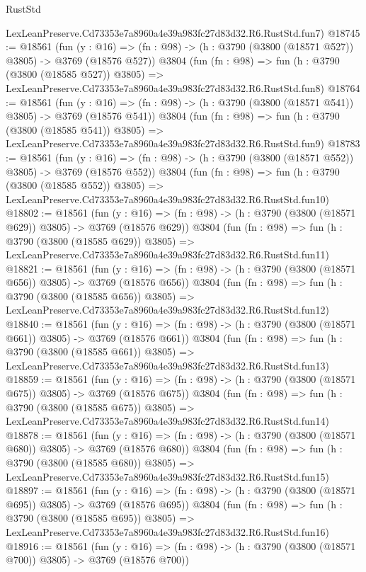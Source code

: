 \begin{lexlean}{RustStd}
\begin{coremodule}
    LexLeanPreserve.Cd73353e7a8960a4e39a983fc27d83d32.R6.RustStd.fun7)
@18745 := @18561
    (fun (y : @16) => (fn : @98) -> (h : @3790 (@3800 (@18571 @527)) @3805) -> @3769 (@18576 @527))
    @3804
    (fun (fn : @98) =>
    fun (h : @3790 (@3800 (@18585 @527)) @3805) =>
    LexLeanPreserve.Cd73353e7a8960a4e39a983fc27d83d32.R6.RustStd.fun8)
@18764 := @18561
    (fun (y : @16) => (fn : @98) -> (h : @3790 (@3800 (@18571 @541)) @3805) -> @3769 (@18576 @541))
    @3804
    (fun (fn : @98) =>
    fun (h : @3790 (@3800 (@18585 @541)) @3805) =>
    LexLeanPreserve.Cd73353e7a8960a4e39a983fc27d83d32.R6.RustStd.fun9)
@18783 := @18561
    (fun (y : @16) => (fn : @98) -> (h : @3790 (@3800 (@18571 @552)) @3805) -> @3769 (@18576 @552))
    @3804
    (fun (fn : @98) =>
    fun (h : @3790 (@3800 (@18585 @552)) @3805) =>
    LexLeanPreserve.Cd73353e7a8960a4e39a983fc27d83d32.R6.RustStd.fun10)
@18802 := @18561
    (fun (y : @16) => (fn : @98) -> (h : @3790 (@3800 (@18571 @629)) @3805) -> @3769 (@18576 @629))
    @3804
    (fun (fn : @98) =>
    fun (h : @3790 (@3800 (@18585 @629)) @3805) =>
    LexLeanPreserve.Cd73353e7a8960a4e39a983fc27d83d32.R6.RustStd.fun11)
@18821 := @18561
    (fun (y : @16) => (fn : @98) -> (h : @3790 (@3800 (@18571 @656)) @3805) -> @3769 (@18576 @656))
    @3804
    (fun (fn : @98) =>
    fun (h : @3790 (@3800 (@18585 @656)) @3805) =>
    LexLeanPreserve.Cd73353e7a8960a4e39a983fc27d83d32.R6.RustStd.fun12)
@18840 := @18561
    (fun (y : @16) => (fn : @98) -> (h : @3790 (@3800 (@18571 @661)) @3805) -> @3769 (@18576 @661))
    @3804
    (fun (fn : @98) =>
    fun (h : @3790 (@3800 (@18585 @661)) @3805) =>
    LexLeanPreserve.Cd73353e7a8960a4e39a983fc27d83d32.R6.RustStd.fun13)
@18859 := @18561
    (fun (y : @16) => (fn : @98) -> (h : @3790 (@3800 (@18571 @675)) @3805) -> @3769 (@18576 @675))
    @3804
    (fun (fn : @98) =>
    fun (h : @3790 (@3800 (@18585 @675)) @3805) =>
    LexLeanPreserve.Cd73353e7a8960a4e39a983fc27d83d32.R6.RustStd.fun14)
@18878 := @18561
    (fun (y : @16) => (fn : @98) -> (h : @3790 (@3800 (@18571 @680)) @3805) -> @3769 (@18576 @680))
    @3804
    (fun (fn : @98) =>
    fun (h : @3790 (@3800 (@18585 @680)) @3805) =>
    LexLeanPreserve.Cd73353e7a8960a4e39a983fc27d83d32.R6.RustStd.fun15)
@18897 := @18561
    (fun (y : @16) => (fn : @98) -> (h : @3790 (@3800 (@18571 @695)) @3805) -> @3769 (@18576 @695))
    @3804
    (fun (fn : @98) =>
    fun (h : @3790 (@3800 (@18585 @695)) @3805) =>
    LexLeanPreserve.Cd73353e7a8960a4e39a983fc27d83d32.R6.RustStd.fun16)
@18916 := @18561
    (fun (y : @16) => (fn : @98) -> (h : @3790 (@3800 (@18571 @700)) @3805) -> @3769 (@18576 @700))

\end{coremodule}
\end{lexlean}
